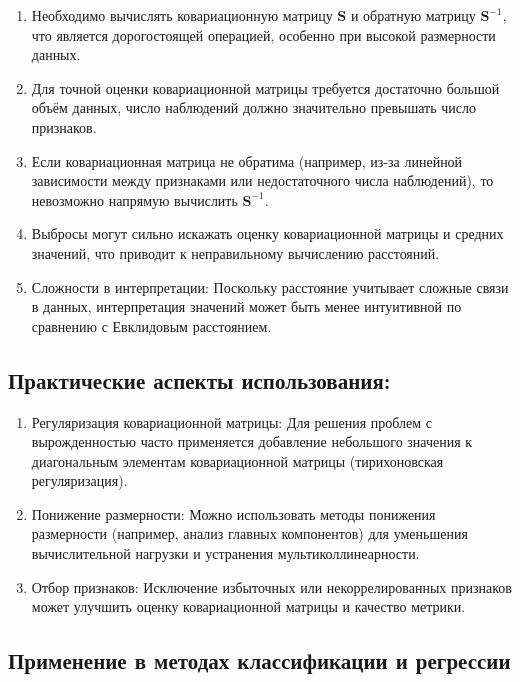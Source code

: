 \begin{enumerate}
    \item Необходимо вычислять ковариационную матрицу \( \mathbf{S} \)  и обратную матрицу \( \mathbf{S}^{-1} \), что является дорогостоящей операцией, особенно при высокой размерности данных.

    \item Для точной оценки ковариационной матрицы требуется достаточно большой объём данных, число наблюдений должно значительно превышать число признаков.

    \item Если ковариационная матрица не обратима (например, из-за линейной зависимости между признаками или недостаточного числа наблюдений), то невозможно напрямую вычислить \( \mathbf{S}^{-1} \).

    \item Выбросы могут сильно искажать оценку ковариационной матрицы и средних значений, что приводит к неправильному вычислению расстояний.

    \item Сложности в интерпретации: Поскольку расстояние учитывает сложные связи в данных, интерпретация значений может быть менее интуитивной по сравнению с Евклидовым расстоянием.
\end{enumerate}

\subsection{Практические аспекты использования:}

\begin{enumerate}
    \item Регуляризация ковариационной матрицы: Для решения проблем с вырожденностью часто применяется добавление небольшого значения к диагональным элементам ковариационной матрицы (тирихоновская регуляризация).

    \item Понижение размерности: Можно использовать методы понижения размерности (например, анализ главных компонентов) для уменьшения вычислительной нагрузки и устранения мультиколлинеарности.

    \item Отбор признаков: Исключение избыточных или некоррелированных признаков может улучшить оценку ковариационной матрицы и качество метрики.
\end{enumerate}

\subsection{Применение в методах классификации и регрессии}

